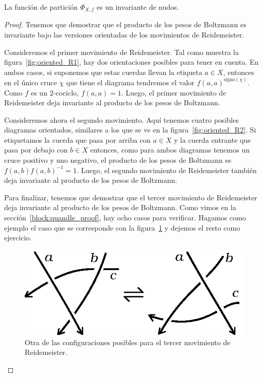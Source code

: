 \documentclass[graybox]{svmult}
\begin{document}
\begin{theorem}
    La función de partición $\Phi_{X,f}$ es un invariante de nudos. 

    \begin{proof}
        Tenemos que demostrar que el producto de los pesos de Boltzmann es
        invariante bajo las versiones orientadas de los movimientos de
        Reidemeister. 

        Consideremos el primer movimiento de Reidemeister. Tal como muestra la
        figura~\ref{fig:oriented_R1}, hay dos orientaciones posibles para tener
        en cuenta.  En ambos casos, si suponemos que estas cuerdas llevan la
        etiqueta $a\in X$, entonces en el único cruce $\chi$ que tiene el
        diagrama tendremos el valor $f(a,a)^{\text{signo}(\chi)}$. Como $f$ es
        un $2$-cociclo, $f(a,a)=1$. Luego, el primer movimiento de Reidemeister
        deja invariante al producto de los pesos de Boltzmann.
    
        Consideremos ahora el segundo movimiento. Aquí tenemos cuatro posibles
        diagramas orientados, similares a los que se ve en la
        figura~\ref{fig:oriented_R2}.  Si etiquetamos la cuerda que pasa por
        arriba con $a\in X$ y la cuerda entrante que pasa por debajo con $b\in
        X$ entonces, como para ambos diagramas tenemos un cruce positivo y uno
        negativo, el producto de los pesos de Boltzmann es
        $f(a,b)f(a,b)^{-1}=1$. Luego, el segundo movimiento de Reidemeister
        también deja invariante al producto de los pesos de Boltzmann.

        Para finalizar, tenemos que demostrar que el tercer movimiento de
        Reidemeister deja invariante al producto de los pesos de Boltzmann.
        Como vimos en la sección~\ref{block:quandle_proof}, hay ocho casos para verificar.
        Hagamos como ejemplo el caso que se corresponde con la
        figura~\ref{fig:oriented_R3b} y dejemos el resto como ejercicio.
        \begin{figure}[h]
			\centering
		    \includegraphics[scale=0.6]{images/oriented_R3b}
            \caption{Otra de las configuraciones posibles para el tercer
            movimiento de Reidemeister.}
            \label{fig:oriented_R3b}
        \end{figure}


\end{proof}
\end{theorem}
\end{document}
